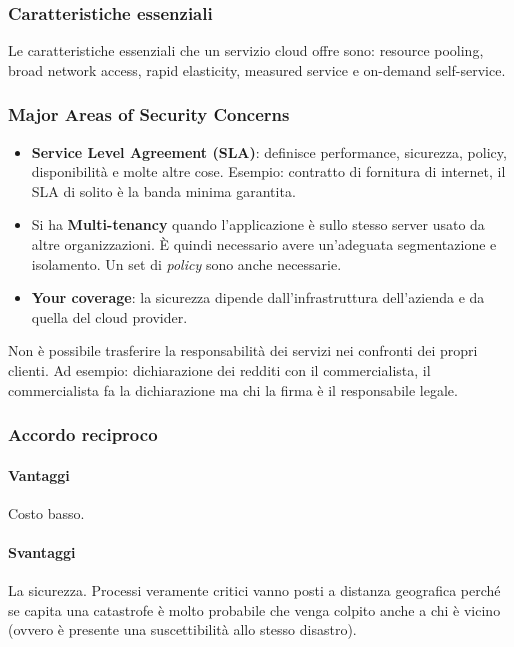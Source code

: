 \subsubsection{Caratteristiche essenziali}

Le caratteristiche essenziali che un servizio cloud offre sono: resource
pooling, broad network access, rapid elasticity, measured service e on-demand
self-service.

\subsubsection{Major Areas of Security Concerns}

\begin{itemize}
 \item \textbf{Service Level Agreement (SLA)}: definisce performance,
sicurezza, policy, disponibilità e molte altre cose. Esempio: contratto di
fornitura di internet, il SLA di solito è la banda minima garantita.
 \item Si ha \textbf{Multi-tenancy} quando l'applicazione è sullo stesso server
usato da altre organizzazioni. È quindi necessario avere un'adeguata
segmentazione e isolamento. Un set di \textit{policy} sono anche necessarie.
 \item \textbf{Your coverage}: la sicurezza dipende dall'infrastruttura
dell'azienda e da quella del cloud provider.
\end{itemize}

Non è possibile trasferire la responsabilità dei servizi nei confronti dei
propri clienti. Ad esempio: dichiarazione dei redditi con il commercialista, il
commercialista fa la dichiarazione ma chi la firma è il responsabile legale.

\subsubsection{Accordo reciproco}

\paragraph*{Vantaggi} Costo basso.

\paragraph*{Svantaggi} La sicurezza. Processi veramente critici vanno posti a
distanza geografica perché se capita una catastrofe è molto probabile che venga
colpito anche a chi è vicino (ovvero è presente una suscettibilità allo stesso
disastro).
